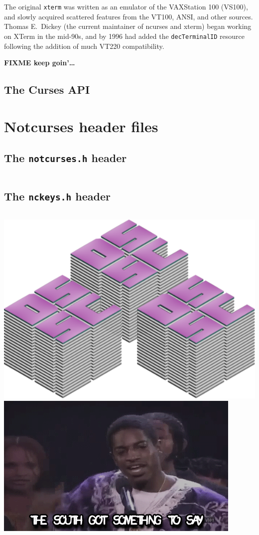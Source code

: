 \documentclass[letterpaper,10pt]{article}
\begin{document}
\begin{appendices}
The original \texttt{xterm} was written as an emulator of the VAXStation 100
(VS100), and slowly acquired scattered features from the VT100, ANSI, and other
sources\cite{xtermfaq}. Thomas E.\ Dickey (the current maintainer of \Gls{ncurses}
and xterm) began working on XTerm in the mid-90s, and by 1996 had added the
\texttt{decTerminalID} resource following the addition of much VT220 compatibility.

\textbf{FIXME keep goin'\ldots}

\subsection{The Curses API}

\newpage

\section{Notcurses header files}
\subsection{The \texttt{notcurses.h} header}
\bgroup
\inputminted[linenos,breaklines=true]{C}{code/notcurses.h}
\egroup

\subsection{The \texttt{nckeys.h} header}
\bgroup
\inputminted[linenos,breaklines=true]{C}{code/nckeys.h}
\egroup

\end{appendices}
\newpage
\glsaddallunused
\printglossary[title={Glossary of terms \textit{as used in this manuscript}}]
\newpage
\printbibliography
\vfill
\begin{center}
\includegraphics[width=.4\linewidth]{../common/dsscaw-purp-scaled.png}
\includegraphics[width=.5\linewidth]{../common/south.png}
\end{center}
\end{document}
